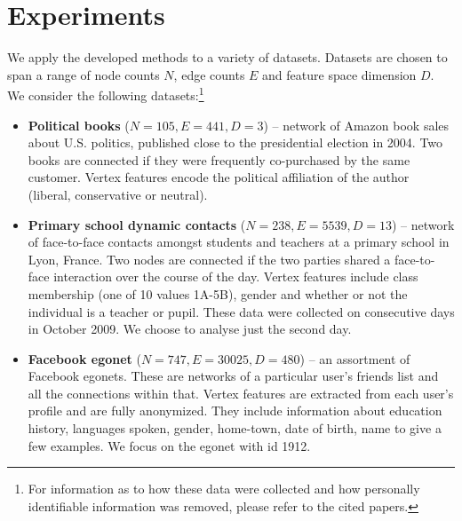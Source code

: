 \section{Experiments}
\label{sec:experiments}

We apply the developed methods to a variety of datasets. Datasets are chosen to span a range of node counts $N$, edge counts $E$ and feature space dimension $D$. We consider the following datasets:\footnote{For information as to how these data were collected and how personally identifiable information was removed, please refer to the cited papers.}

\begin{itemize}
	\item \textbf{Political books} \cite{polbooks} ($N=105, E=441, D=3$) -- network of Amazon book sales about U.S. politics, published close to the presidential election in 2004. Two books are connected if they were frequently co-purchased by the same customer. Vertex features encode the political affiliation of the author (liberal, conservative or neutral).
		
	\item \textbf{Primary school dynamic contacts} \cite{schools} ($N=238, E=5539, D=13$) -- network of face-to-face contacts amongst students and teachers at a primary school in Lyon, France. Two nodes are connected if the two parties shared a face-to-face interaction over the course of the day. Vertex features include class membership (one of 10 values 1A-5B), gender and whether or not the individual is a teacher or pupil. These data were collected on consecutive days in October 2009. We choose to analyse just the second day.
	
	\item \textbf{Facebook egonet} \cite{fb-snap} ($N=747, E=30025, D=480$) -- an assortment of Facebook egonets. These are networks of a particular user's friends list and all the connections within that. Vertex features are extracted from each user's profile and are fully anonymized. They include information about education history, languages spoken, gender, home-town, date of birth, name to give a few examples. We focus on the egonet with id 1912.

\end{itemize}

